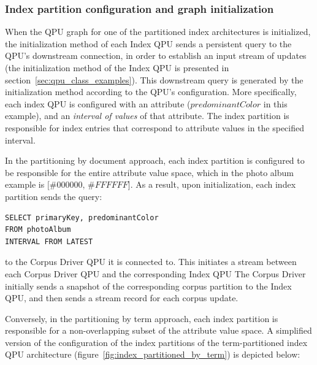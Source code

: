 \subsubsection{Index partition configuration and graph initialization}

When the QPU graph for one of the partitioned index architectures is initialized,
the initialization method of each Index QPU sends a persistent query to the QPU's downstream connection,
in order to establish an input stream of updates (the initialization method of the Index QPU is presented in section~\ref{sec:qpu_class_examples}).
This downstream query is generated by the initialization method according to the QPU's configuration.
More specifically, each index QPU is configured with an attribute ($predominantColor$ in this example),
and an \textit{interval of values} of that attribute.
The index partition is responsible for index entries that correspond to attribute values in the specified interval.

In the partitioning by document approach,
each index partition is configured to be responsible for the entire attribute value space,
which in the photo album example is $[\#000000$, $\#FFFFFF$].
As a result, upon initialization, each index partition sends the query:

\begin{lstlisting}[caption={Query sent during initialization from each index partition to the corresponding Corpus Driver QPU,
  in the QPU graph shown in Figure~\ref{fig:index_partitioned_by_document}.}]
SELECT primaryKey, predominantColor
FROM photoAlbum
INTERVAL FROM LATEST
\end{lstlisting}

\noindent
to the Corpus Driver QPU it is connected to.
This initiates a stream between each Corpus Driver QPU and the corresponding Index QPU
The Corpus Driver initially sends a snapshot of the corresponding corpus partition to the
Index QPU, and then sends a stream record for each corpus update.

Conversely, in the partitioning by term approach, each index partition is responsible for a non-overlapping subset of the
attribute value space.
A simplified version of the configuration of the index partitions of the term-partitioned index QPU architecture
(figure~\ref{fig:index_partitioned_by_term}) is depicted below: \\


